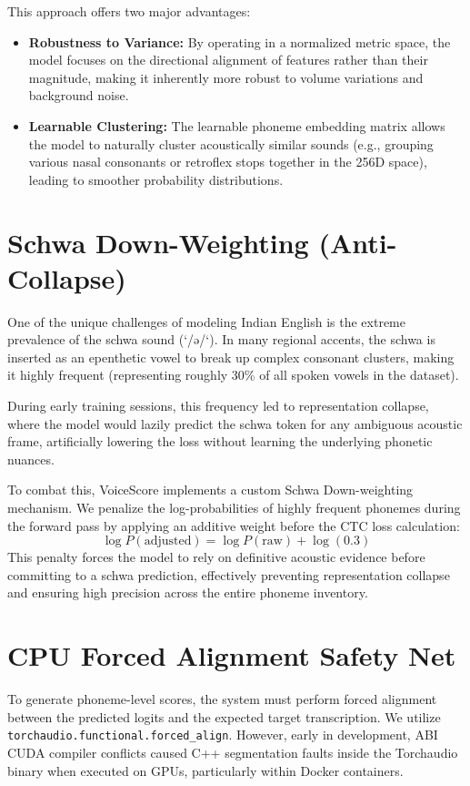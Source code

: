 This approach offers two major advantages:
\begin{itemize}
    \item \textbf{Robustness to Variance:} By operating in a normalized metric space, the model focuses on the directional alignment of features rather than their magnitude, making it inherently more robust to volume variations and background noise.
    \item \textbf{Learnable Clustering:} The learnable phoneme embedding matrix allows the model to naturally cluster acoustically similar sounds (e.g., grouping various nasal consonants or retroflex stops together in the 256D space), leading to smoother probability distributions.
\end{itemize}

\section{Schwa Down-Weighting (Anti-Collapse)}
One of the unique challenges of modeling Indian English is the extreme prevalence of the schwa sound (`/ə/`). In many regional accents, the schwa is inserted as an epenthetic vowel to break up complex consonant clusters, making it highly frequent (representing roughly 30\% of all spoken vowels in the dataset).

During early training sessions, this frequency led to representation collapse, where the model would lazily predict the schwa token for any ambiguous acoustic frame, artificially lowering the loss without learning the underlying phonetic nuances.

To combat this, VoiceScore implements a custom Schwa Down-weighting mechanism. We penalize the log-probabilities of highly frequent phonemes during the forward pass by applying an additive weight before the CTC loss calculation:
\begin{equation}
    \log P(\text{adjusted}) = \log P(\text{raw}) + \log(0.3)
\end{equation}
This penalty forces the model to rely on definitive acoustic evidence before committing to a schwa prediction, effectively preventing representation collapse and ensuring high precision across the entire phoneme inventory.

\section{CPU Forced Alignment Safety Net}
To generate phoneme-level scores, the system must perform forced alignment between the predicted logits and the expected target transcription. We utilize \texttt{torchaudio.functional.forced\_align}. However, early in development, ABI CUDA compiler conflicts caused C++ segmentation faults inside the Torchaudio binary when executed on GPUs, particularly within Docker containers.

